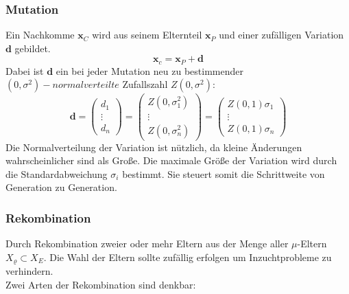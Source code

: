 \subsubsection[Mutation]{Mutation}
Ein Nachkomme $\mathbf{x}_C$ wird aus seinem Elternteil $\mathbf{x}_P$ und einer zufälligen Variation $\mathbf{d}$ gebildet.
\begin{equation} \label{eq:Mutation_Child}
	\mathbf{x}_c = \mathbf{x}_P + \mathbf{d}
\end{equation}
Dabei ist $\mathbf{d}$ ein bei jeder Mutation neu zu bestimmender $(0,\sigma^2)-normalverteilte$ Zufallszahl $Z(0,\sigma^2)$:
\begin{equation}\label{eq:wavenumber_trilateration_model2}
\mathbf{d}=
\left(
	\begin{array}{c}
		d_1 \\
		\vdots\\
		d_n 
	\end{array}
\right)
=
\left(
	\begin{array}{c}
		Z(0,\sigma_1^2) \\
		\vdots\\
		Z(0,\sigma_n^2) 
	\end{array}
\right)
=
\left(
	\begin{array}{c}
		Z(0,1) \sigma_1 \\
		\vdots\\
		Z(0,1) \sigma_n 
	\end{array}
\right)
\end{equation}
%
Die Normalverteilung der Variation ist nützlich, da kleine Änderungen wahrscheinlicher sind als Große. Die maximale Größe der Variation wird durch die Standardabweichung $\sigma_i$ bestimmt. Sie steuert somit die Schrittweite von Generation zu Generation.
%
\subsubsection[Rekombination]{Rekombination}
Durch Rekombination zweier oder mehr Eltern aus der Menge aller $\mu$-Eltern $X_{\varrho} \subset X_E$. Die Wahl der Eltern sollte zufällig erfolgen um Inzuchtprobleme zu verhindern.\\
Zwei Arten der Rekombination sind denkbar:\\

